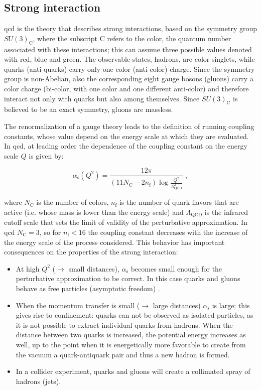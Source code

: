 \subsection{Strong interaction}
\label{sec:strong}

\gls{qcd} is the theory that describes strong interactions, based on the symmetry group $SU(3)_\mathrm{C}$, where the subscript C refers to the color, the quantum number associated with these interactions; this can assume three possible values denoted with red, blue and green. The observable states, hadrons, are color singlets, while quarks (anti-quarks) carry only one color (anti-color) charge. Since the symmetry group is non-Abelian, also the corresponding eight gauge bosons (gluons) carry a color charge (bi-color, with one color and one different anti-color) and therefore interact not only with quarks but also among themselves. Since $SU(3)_\mathrm{C}$ is believed to be an exact symmetry,  gluons are massless. 

The renormalization of a gauge theory leads to the definition of running coupling constants, whose value depend on the energy scale at which they are evaluated. In \gls{qcd}, at leading order the dependence of the coupling constant on the energy scale $Q$ is given by:

\begin{equation}
\alpha_\mathrm{s}(Q^2)=\frac{12\pi}{\left(11N_\mathrm{C}-2n_\mathrm{f}\right)\log{\frac{Q^2}{\Lambda_\mathrm{QCD}^2}}} \; , 
\label{eq:alfaQCD}
\end{equation}

\noindent where $N_\mathrm{C}$ is the number of colors, $n_\mathrm{f}$ is the number of quark flavors that are active (i.e. whose mass is lower than the energy scale) and $\Lambda_\mathrm{QCD}$ is the infrared cutoff scale that sets the limit of validity of the perturbative approximation. In \gls{qcd} $N_\mathrm{C} = 3$, so for $n_\mathrm{f}<16$ the coupling constant decreases with the increase of the energy scale of the process considered. This behavior has important consequences on the properties of the strong interaction:

\begin{itemize}
\item At high $Q^2$ ($\rightarrow$ small distances), $\alpha_\mathrm{s}$ becomes small enough for the perturbative approximation to be correct. In this case quarks and gluons behave as free particles (asymptotic freedom) \cite{PhysRevLett.30.1343, PhysRevLett.30.1346}.
\item When the momentum transfer is small ($\rightarrow$ large distances) $\alpha_\mathrm{s}$ is large; this gives rise to confinement: quarks can not be observed as isolated particles, as it is not possible to extract individual quarks from hadrons. When the distance between two quarks is increased, the potential energy increases as well, up to the point when it is energetically more favorable to create from the vacuum a quark-antiquark pair and thus a new hadron is formed.
\item In a collider experiment, quarks and gluons will create a collimated spray of hadrons (jets).
\end{itemize}

